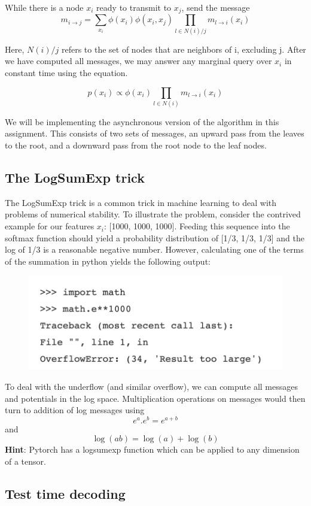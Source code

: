 \documentclass[11pt,addpoints,answers]{exam}
\numberwithin{equation}{section} %
\numberwithin{figure}{section} %
\numberwithin{table}{section} %
\begin{document}
While there is a node 
$x_i$ ready to transmit to $x_j$, send the message
$$m_{i \rightarrow j} = \sum_{x_i} \phi(x_i) \phi(x_i,x_j) \prod_{l \in N(i) / j} m_{ l \rightarrow i} (x_i)$$
 
Here, $N(i) / j$ refers to the set of nodes that are neighbors of i, excluding j. 
After we have computed all messages, we may answer any marginal query over $x_i$ in constant time using the equation.

$$p(x_i) \propto \phi(x_i) \prod_{l \in N(i)} m_{l \rightarrow i} (x_i)$$

We will be implementing the asynchronous version of the algorithm in this assignment. This consists of two sets of messages, an upward pass from the leaves to the root, and a downward pass from the root node to the leaf nodes.
\subsection{The LogSumExp trick} \label{LogSumExp}
The LogSumExp trick is a common trick in machine learning to deal with problems of numerical stability. 
To illustrate the problem, consider the contrived example for our features ${x_i}$: [1000, 1000, 1000]. Feeding this sequence into the softmax function should yield a probability distribution of [1/3, 1/3, 1/3] and the log of 1/3 is a reasonable negative number. However, calculating one of the terms of the summation in python yields the following output:
\begin{figure}[h]
\centering
\includegraphics[width=0.50\linewidth]{fig/overflow.png}

\label{overflow}
\end{figure}

To deal with the underflow (and similar overflow), we can compute all messages and potentials in the log space. Multiplication operations on messages would then turn to addition of log messages using  $$e^a. e^b = e^{a + b}$$ and $$\log(ab) = \log (a) + \log (b)$$
\textbf{Hint}: Pytorch has a logsumexp function which can be applied to any dimension of a tensor.

\subsection{Test time decoding}
\end{document}
